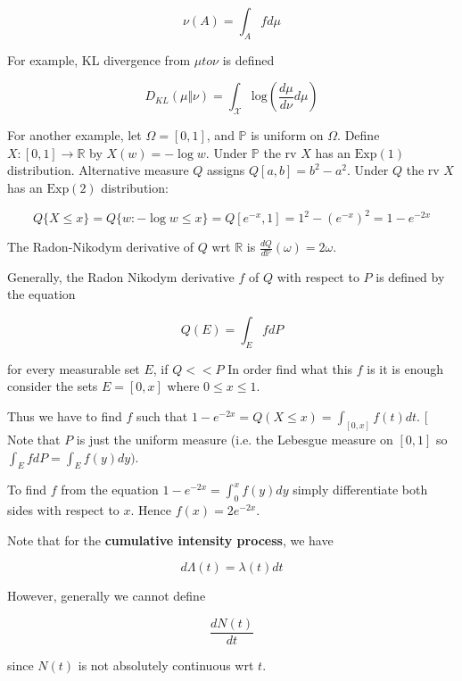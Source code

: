 \documentclass[12pt]{article}
\theoremstyle{nonumberbreak}
\begin{document}
$$
\nu(A) = \int_A f d\mu
$$

For example, KL divergence from $\mu to \nu$ is defined

$$
D_{KL} (\mu \Vert \nu) = \int_\mathcal{X} \mathrm{log} \left( \frac{d\mu}{d\nu} d\mu \right)
$$


For another example, let $\Omega = [0,1]$, and $\mathbb{P}$ is uniform on $\Omega$. Define $X:[0,1]\to\mathbb{R}$ by $X(w) = -\log w$. Under $\mathbb{P}$ the rv $X$ has an $\mathrm{Exp}(1)$ distribution. Alternative measure $Q$ assigns $Q[a,b] = b^2 - a^2$. Under $Q$ the rv $X$ has an $\mathrm{Exp}(2)$ distribution: 

$$
Q\{X\leq x\} = Q\{w:-\log w\leq x\} = Q[e^{-x}, 1] = 1^2 - (e^{-x})^2 = 1 - e^{-2x}
$$

The Radon-Nikodym derivative of $Q$ wrt $\mathbb{R}$ is $\frac{dQ}{d\mathbb{P}}(\omega) = 2\omega$.

Generally, the Radon Nikodym derivative $f$ of $Q$ with respect to $P$ is defined by the equation 

$$
Q(E)=\int_E fdP
$$ 

for every measurable set $E$, if $Q << P$ In order find what this $f$ is it is enough consider the sets $E=[0,x]$ where $0\leq x \leq 1$. 

Thus we have to find $f$ such that $1-e^{-2x} =Q(X\leq x)=\int_{[0,x]} f(t)dt$. [ Note that $P$ is just the uniform measure (i.e. the Lebesgue measure on $[0,1]$ so $\int_E fdP=\int_E f(y)dy)$. 

To find $f$ from the equation $1-e^{-2x} =\int_0^{x} f(y)dy$ simply differentiate both sides with respect to $x$. Hence $f(x)=2e^{-2x}$.


Note that for the \textbf{cumulative intensity process}, we have

$$
d \Lambda(t) = \lambda(t) dt
$$

However, generally we cannot define

$$
\frac{dN(t)}{dt}
$$

since $N(t)$ is not absolutely continuous wrt $t$.
\end{document}
